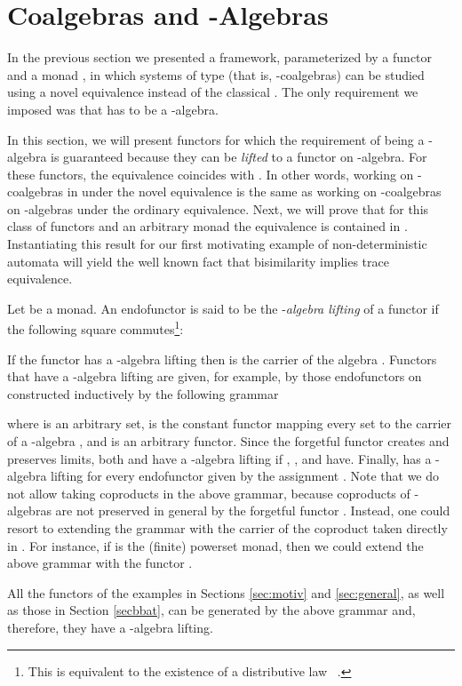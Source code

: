 \documentclass{LMCS}
\begin{document}
\section{Coalgebras and -Algebras}\label{sec:bisim_implies_trace}
In the previous section we presented a framework, parameterized by a
functor  and a monad , in which systems of type  (that
is, -coalgebras) can be studied using a novel equivalence
 instead of the classical . The only
requirement we imposed was that  has to be a -algebra.

In this section, we will present functors  for which the requirement of  being a
-algebra is guaranteed because they can be {\em lifted} to a functor  on -algebra.
For these functors, the equivalence  coincides with . In other words,
working on  -coalgebras in  under the novel  equivalence is the same
as working on -coalgebras on -algebras under the ordinary
 equivalence. Next, we will prove that for this class of functors and an arbitrary monad  the equivalence
 is contained in . Instantiating this result for our first motivating
example of non-deterministic automata will yield the well known fact that bisimilarity implies
trace equivalence.

Let  be a monad. An endofunctor  is
said to be the -\emph{algebra lifting} of a functor  if the following square commutes\footnote{This is
equivalent to the existence of a distributive law  ~\cite{Joh75}.}:

If the functor  has a -algebra
lifting  then  is the carrier of the algebra .  Functors that
have a -algebra lifting are given, for example, by those endo\-functors on 
constructed inductively by the following grammar

where  is an arbitrary set,  is the constant functor mapping
every set  to the carrier of a -algebra , and  is
an arbitrary functor. Since the forgetful functor  creates and preserves limits, both  and  have  a -algebra lifting if , ,
and  have. Finally,  has a -algebra lifting for every
endofunctor  given by the assignment . Note that we do not allow taking coproducts in the
above grammar, because coproducts of -algebras are not preserved
in general by the forgetful functor . Instead, one could
resort to extending the grammar with the carrier of the coproduct
taken directly in . For instance, if  is the (finite)
powerset monad, then we could extend the above grammar with the
functor .

All the functors of the examples in Sections \ref{sec:motiv} and \ref{sec:general}, as well as those in Section \ref{secbbat}, 
can be generated by the above grammar and, therefore, they have a -algebra lifting.
\end{document}
